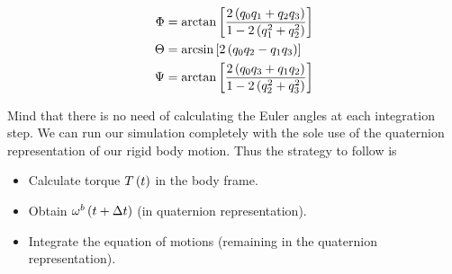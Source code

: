 \begin{align}
\Phi &= \text{arctan}\left[ \frac{2\left(q_0q_1+q_2q_3\right)}{ 1- 2\left(q_1^2+q_2^2\right)}  \right]  \\
\Theta &= \text{arcsin}\left[ 2\left(q_0q_2-q_1q_3\right) \right]  \\
\Psi &= \text{arctan}\left[ \frac{2\left(q_0q_3+q_1q_2\right)}{ 1- 2\left(q_2^2+q_3^2\right)}  \right]  
\label{eq:quaternions_back}
\end{align}

Mind that there is no need of calculating the Euler angles at each integration step. We can run our simulation completely with the sole use of the quaternion representation of our rigid body motion. Thus the strategy to follow is

\begin{itemize}
\item Calculate torque $T\left(t\right)$ in the body frame.
\item Obtain $\omega^b\left(t+\Delta t\right)$ (in quaternion representation).
\item Integrate the equation of motions (remaining in the quaternion representation).
\end{itemize}












